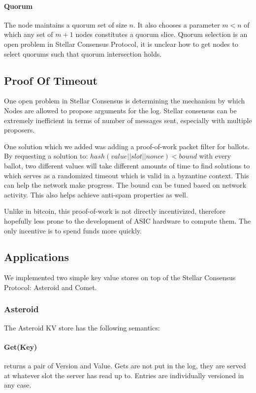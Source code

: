 \documentclass[preprint,11pt]{article} \usepackage{amsmath}
\begin{document}
\paragraph{Quorum}
The node maintains a quorum set of size $n$. It also chooses a
parameter $m < n$ of which any set of $m+1$ nodes constitutes a quorum
slice. Quorum selection is an open problem in Stellar Consensus
Protocol, it is unclear how to get nodes to select quorums such that
quorum intersection holds.

\subsection{Proof Of Timeout}
One open problem in Stellar Consensus is determining the mechanism by
which Nodes are allowed to propose arguments for the log. Stellar
consensus can be extremely inefficient in terms of number of messages
sent, especially with multiple proposers.

One solution which we added was adding a proof-of-work packet filter
for ballots. By requesting a solution to: $hash(value || slot ||
nonce) < bound$ with every ballot, two different values will take
different amounts of time to find solutions to which serves as a
randomized timeout which is valid in a byzantine context. This can
help the network make progress. The bound can be tuned based on
network activity. This also helps achieve anti-spam properties as
well.

Unlike in bitcoin, this proof-of-work is not directly incentivized,
therefore hopefully less prone to the development of ASIC hardware to
compute them. The only incentive is to spend funds more quickly.

\subsection{Applications}
We implemented two simple key value stores on top of the Stellar
Consensus Protocol: Asteroid and Comet.

\subsubsection*{Asteroid}

The Asteroid KV store has the following semantics:

\paragraph{Get(Key)} returns a pair of Version and Value. Gets are not put in the log, they are served
at whatever slot the server has read up to. Entries are individually
versioned in any case.
\end{document}
